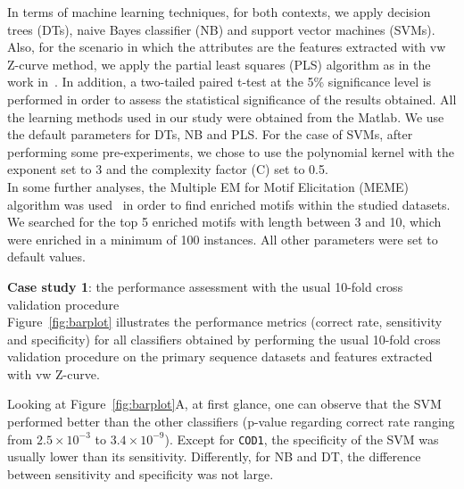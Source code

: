 \documentclass[conference]{IEEEtran}
\begin{document}
In terms of machine learning techniques, for both contexts, we apply decision trees (DTs), naive Bayes classifier (NB) and support vector machines (SVMs). Also, for the scenario in which the attributes are the features extracted with vw Z-curve method, we apply the partial least squares (PLS) algorithm as in the work in~\cite{song2011a}. In addition, a two-tailed paired t-test at the 5\% significance level is performed in order to assess the statistical significance of the results obtained. All the learning methods used in our study were obtained from the Matlab. We use the default parameters for DTs, NB and PLS. For the case of SVMs, after performing some pre-experiments, we chose to use the polynomial kernel with the exponent set to 3 and the complexity factor (C) set to 0.5. \\

In some further analyses, the Multiple EM for Motif Elicitation (MEME) algorithm was used~\cite{bailey2009} in order to find enriched motifs within the studied datasets. We searched for the top 5 enriched motifs with length between 3 and 10, which were enriched in a minimum of 100 instances. All other parameters were set to default values.

\noindent
{\bf Case study 1}: the performance assessment with the usual 10-fold cross validation procedure \\

Figure~\ref{fig:barplot} illustrates the performance metrics (correct rate, sensitivity and specificity) for all classifiers obtained by performing the usual 10-fold cross validation procedure on the primary sequence datasets and features extracted with vw Z-curve.

Looking at Figure~\ref{fig:barplot}A, at first glance, one can observe that the SVM performed better than the other classifiers (p-value regarding correct rate ranging from $2.5\times10^{-3}$ to $3.4\times10^{-9}$). Except for {\tt COD1}, the specificity of the SVM  was usually lower than its sensitivity. Differently, for NB and DT, the difference between sensitivity and specificity was not large.
\end{document}
